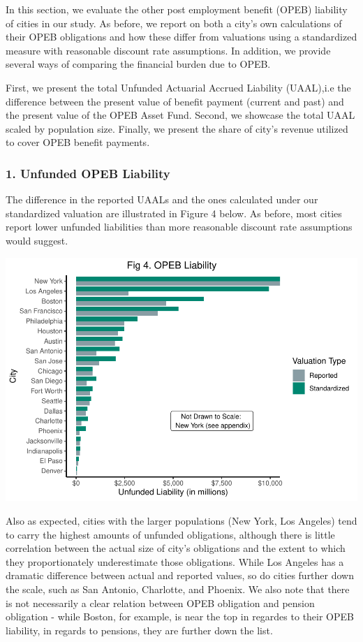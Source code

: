 \documentclass[
]{article}
\begin{document}
In this section, we evaluate the other post employment benefit (OPEB)
liability of cities in our study. As before, we report on both a city's
own calculations of their OPEB obligations and how these differ from
valuations using a standardized measure with reasonable discount rate
assumptions. In addition, we provide several ways of comparing the
financial burden due to OPEB.

First, we present the total Unfunded Actuarial Accrued Liability
(UAAL),i.e the difference between the present value of benefit payment
(current and past) and the present value of the OPEB Asset Fund. Second,
we showcase the total UAAL scaled by population size. Finally, we
present the share of city's revenue utilized to cover OPEB benefit
payments.

\hypertarget{unfunded-opeb-liability}{%
\subsubsection{1. Unfunded OPEB
Liability}\label{unfunded-opeb-liability}}

The difference in the reported UAALs and the ones calculated under our
standardized valuation are illustrated in Figure 4 below. As before,
most cities report lower unfunded liabilities than more reasonable
discount rate assumptions would suggest.

\includegraphics{City-Solvency-Report--Adjusted-_files/figure-latex/unnamed-chunk-9-1.pdf}

Also as expected, cities with the larger populations (New York, Los
Angeles) tend to carry the highest amounts of unfunded obligations,
although there is little correlation between the actual size of city's
obligations and the extent to which they proportionately underestimate
those obligations. While Los Angeles has a dramatic difference between
actual and reported values, so do cities further down the scale, such as
San Antonio, Charlotte, and Phoenix. We also note that there is not
necessarily a clear relation between OPEB obligation and pension
obligation - while Boston, for example, is near the top in regardes to
their OPEB liability, in regards to pensions, they are further down the
list.
\end{document}
